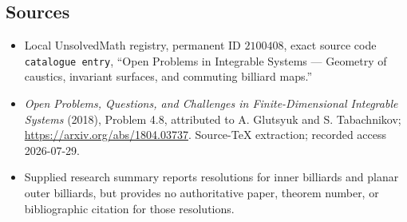 \documentclass[11pt]{article}
\begin{document}
\subsection{Sources}
\begin{itemize}
\item Local UnsolvedMath registry, permanent ID \(2100408\), exact source code \texttt{catalogue entry}, ``Open Problems in Integrable Systems --- Geometry of caustics, invariant surfaces, and commuting billiard maps.''
\item \emph{Open Problems, Questions, and Challenges in Finite-Dimensional Integrable Systems} (2018), Problem 4.8, attributed to A. Glutsyuk and S. Tabachnikov; \url{https://arxiv.org/abs/1804.03737}. Source-TeX extraction; recorded access 2026-07-29.
\item Supplied research summary reports resolutions for inner billiards and planar outer billiards, but provides no authoritative paper, theorem number, or bibliographic citation for those resolutions.
\end{itemize}
\end{document}

